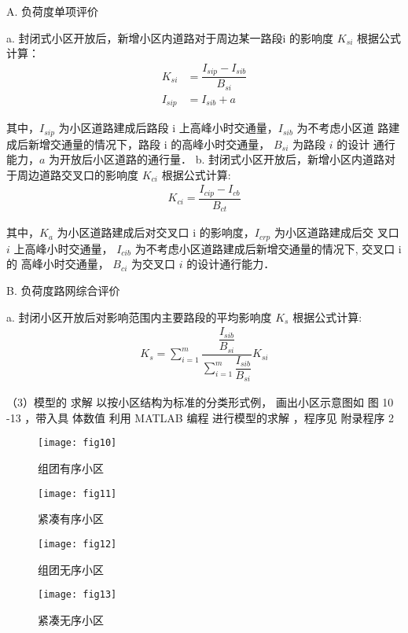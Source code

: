 A. 负荷度单项评价

a. 封闭式小区开放后，新增小区内道路对于周边某一路段i 的影响度 $K_{si}$
根据公式计算：
\begin{align}
K_{s i}&=\dfrac{I_{s i p}-I_{s i b}}{B_{s i}} \\
I_{s i p}& =I_{s i b}+a
\end{align}

其中，$I _{sip}$ 为小区道路建成后路段 i 上高峰小时交通量，$I _{sib}$ 为不考虑小区道
 路建成后新增交通量的情况下，路段 i 的高峰小时交通量，  $B_{s i}$  为路段 $i$ 的设计
 通行能力，$a$ 为开放后小区道路的通行量．
b. 封闭式小区开放后，新增小区内道路对于周边道路交叉口的影响度  $K_{c i}$
根据公式计算:
\begin{align}
  K_{c i}=\dfrac{I_{c i p}-I_{c b}}{B_{c t}}
\end{align}


其中，$K_a$ 为小区道路建成后对交叉口 i 的影响度，$I_{crp}$ 为小区道路建成后交 叉口 $i$
上高峰小时交通量， $ I_{c i b}$  为不考虑小区道路建成后新增交通量的情况下, 交叉口 i 的
高峰小时交通量，  $B_{c i}$  为交叉口 $i$ 的设计通行能力．

B. 负荷度路网综合评价

a. 封闭小区开放后对影响范围内主要路段的平均影响度  $K_{s}$  根据公式计算:
\begin{align}
 K_{s}=\sum_{i=1}^{m} \dfrac{\dfrac{I_{s i b}}{B_{s i}}}{\sum_{i=1}^{m} \dfrac{I_{s i b}}{B_{s i}}} K_{s i}
\end{align}

（3）模型的 求解
以按小区结构为标准的分类形式例， 画出小区示意图如 图 10 -13 ，带入具 体数值 利用 MATLAB 编程
 进行模型的求解 ，程序见 附录程序 2

\begin{figure}
  \centering
  \begin{minipage}{.5\linewidth}
   \centerline{\texttt{[image: fig10]}}
   \caption{组团有序小区}
  \end{minipage}\begin{minipage}{.5\linewidth}
   \centerline{\texttt{[image: fig11]}}
   \caption{紧凑有序小区}
  \end{minipage}

  \begin{minipage}{.5\linewidth}
   \centerline{\texttt{[image: fig12]}}
   \caption{组团无序小区}
  \end{minipage}\begin{minipage}{.5\linewidth}
   \centerline{\texttt{[image: fig13]}}
   \caption{紧凑无序小区}
  \end{minipage}
\end{figure}

